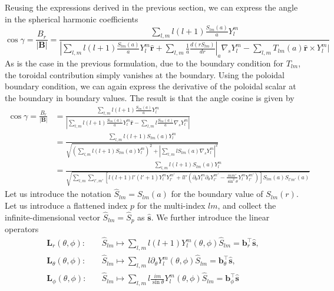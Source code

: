 \documentclass[a4paper, 11pt]{article}
\begin{document}
Reusing the expressions derived in the previous section, we can express the angle in the spherical harmonic coefficients
\[
    \cos\gamma = \frac{B_r}{|\mathbf{B}|} = \frac{\sum_{l,m} l(l+1) \frac{S_{lm}(a)}{a} Y_l^m}{|\sum_{l,m} l(l+1) \frac{S_{lm}(a)}{a} Y_l^m \hat{\mathbf{r}} + \sum_{l,m} \frac{1}{a} \frac{d(rS_{lm})}{dr}|_a \nabla_s Y_l^m - \sum_{l,m} T_{lm}(a) \hat{\mathbf{r}}\times Y_l^m |}
\]
As is the case in the previous formulation, due to the boundary condition for $T_{lm}$, the toroidal contribution simply vanishes at the boundary. Using the poloidal boundary condition, we can again express the derivative of the poloidal scalar at the boundary in boundary values. The result is that the angle cosine is given by
\[\begin{aligned}
    \cos\gamma = \frac{B_r}{|\mathbf{B}|} &= \frac{\displaystyle \sum_{l,m} l(l+1) \frac{S_{lm}(a)}{a} Y_l^m}{\displaystyle \left|\sum_{l,m} l(l+1) \frac{S_{lm}(a)}{a} Y_l^m\hat{\mathbf{r}} - \sum_{l,m} l \frac{S_{lm}(a)}{a} \nabla_s Y_l^m \right|} \\ 
    &= \frac{\displaystyle \sum_{l,m} l(l+1) S_{lm}(a) Y_l^m}{\displaystyle \sqrt{\left(\sum_{l,m} l(l+1) S_{lm}(a) Y_l^m\right)^2 + \left|\sum_{l,m} l S_{lm}(a) \nabla_s Y_l^m\right|^2}} \\ 
    &= \frac{\displaystyle \sum_{l,m} l(l+1) S_{lm}(a) Y_l^m}{\displaystyle \sqrt{\sum_{l,m} \sum_{l',m'} \left[l(l+1) l'(l'+1) Y_l^m Y_{l'}^{m'} + ll'\left(\partial_\theta Y_{l}^{m} \partial_\theta Y_{l'}^{m'} - \frac{mm'}{\sin^2\theta}Y_l^m Y_{l'}^{m'}\right)\right] S_{lm}(a) S_{l'm'}(a)}}
\end{aligned}\]
Let us introduce the notation $\hat{S}_{lm} = S_{lm}(a)$ for the boundary value of $S_{lm}(r)$. Let us introduce a flattened index $p$ for the multi-index $lm$, and collect the infinite-dimensional vector $\hat{S}_{lm} = \hat{S}_p$ as $\mathbf{\hat{\mathbf{s}}}$. We further introduce the linear operators 
\[\begin{aligned}
    \mathbf{L}_r(\theta, \phi):& \quad \hat{S}_{lm} \mapsto \sum_{l,m} l(l+1) Y_l^m(\theta, \phi) \hat{S}_{lm} = \mathbf{b}_r^\top \hat{\mathbf{s}}, \\
    \mathbf{L}_\theta(\theta, \phi):& \quad \hat{S}_{lm} \mapsto \sum_{l,m} l \partial_\theta Y_l^m(\theta, \phi) \hat{S}_{lm} = \mathbf{b}_\theta^\top \hat{\mathbf{s}}, \\
    \mathbf{L}_\phi(\theta, \phi):& \quad \hat{S}_{lm} \mapsto \sum_{l,m} l \frac{im}{\sin\theta} Y_l^m(\theta, \phi) \hat{S}_{lm} = \mathbf{b}_\phi^\top \hat{\mathbf{s}}
\end{aligned}\]
\end{document}
